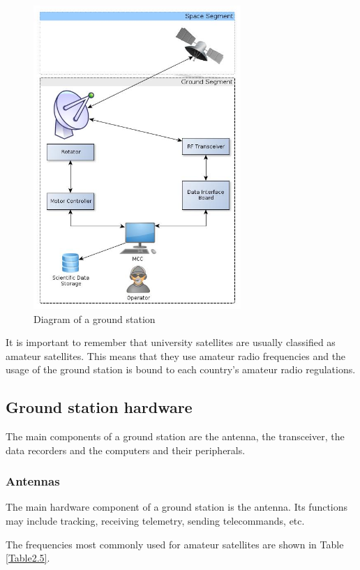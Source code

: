 \begin{figure}[H]
\centerline{\includegraphics[width=0.7\textwidth]{images/gsdiagram.jpg}}
\caption{Diagram of a ground station}
\label{f2.7}
\end{figure}


It is important to remember that university satellites are usually classified as amateur satellites. This means that they use amateur radio frequencies and the usage of the ground station is bound to each country's amateur radio regulations.
\pagebreak
\subsection{Ground station hardware}

The main components of a ground station are the antenna, the transceiver, the data recorders and the computers and their peripherals.

\subsubsection{Antennas}
The main hardware component of a ground station is the antenna. Its functions may include tracking, receiving telemetry, sending telecommands, etc.

The frequencies most commonly used for amateur satellites are shown in Table \ref{Table2.5}.

